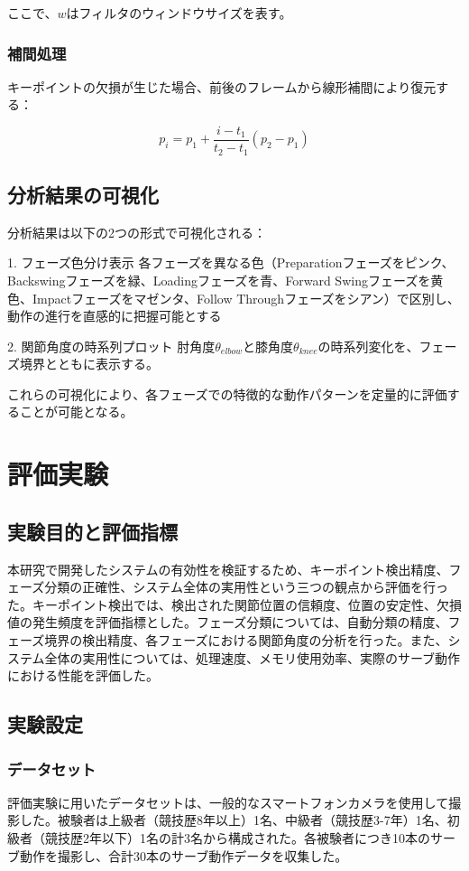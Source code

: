 \documentclass[oneside]{suribt}[11pt]
\begin{document}
ここで、$w$はフィルタのウィンドウサイズを表す。

\subsection{補間処理}
キーポイントの欠損が生じた場合、前後のフレームから線形補間により復元する：

\begin{equation}
p_i = p_1 + \frac{i - t_1}{t_2 - t_1}(p_2 - p_1)
\end{equation}

\section{分析結果の可視化}
分析結果は以下の2つの形式で可視化される：

1. フェーズ色分け表示
各フェーズを異なる色（Preparationフェーズをピンク、Backswingフェーズを緑、Loadingフェーズを青、Forward Swingフェーズを黄色、Impactフェーズをマゼンタ、Follow Throughフェーズをシアン）で区別し、動作の進行を直感的に把握可能とする

2. 関節角度の時系列プロット
   肘角度$\theta_{elbow}$と膝角度$\theta_{knee}$の時系列変化を、フェーズ境界とともに表示する。

これらの可視化により、各フェーズでの特徴的な動作パターンを定量的に評価することが可能となる。

\chapter{評価実験}

\section{実験目的と評価指標}
本研究で開発したシステムの有効性を検証するため、キーポイント検出精度、フェーズ分類の正確性、システム全体の実用性という三つの観点から評価を行った。キーポイント検出では、検出された関節位置の信頼度、位置の安定性、欠損値の発生頻度を評価指標とした。フェーズ分類については、自動分類の精度、フェーズ境界の検出精度、各フェーズにおける関節角度の分析を行った。また、システム全体の実用性については、処理速度、メモリ使用効率、実際のサーブ動作における性能を評価した。

\section{実験設定}
\subsection{データセット}
評価実験に用いたデータセットは、一般的なスマートフォンカメラを使用して撮影した。被験者は上級者（競技歴8年以上）1名、中級者（競技歴3-7年）1名、初級者（競技歴2年以下）1名の計3名から構成された。各被験者につき10本のサーブ動作を撮影し、合計30本のサーブ動作データを収集した。
\end{document}
